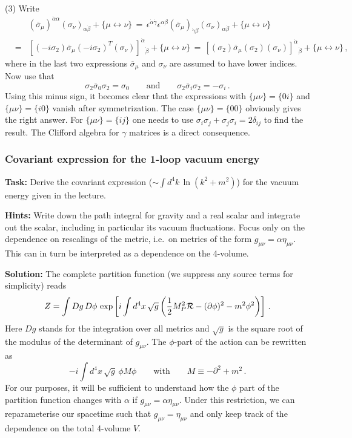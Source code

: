 \documentclass[12pt]{article}
\newcommand{\be}{\begin{equation}}
\newcommand{\ee}{\end{equation}}
\newcommand{\bea}{\begin{eqnarray}}
\newcommand{\eea}{\end{eqnarray}}
\newcommand{\ol}{\overline}
\numberwithin{equation}{section}
\begin{document}
\noindent
(3) Write
\bea
&&(\ol{\sigma}_\mu)^{\dot{\alpha}\alpha}(\sigma_\nu)_{\alpha\dot{\beta}}+\{\mu\leftrightarrow\nu\}\,=\,\epsilon^{\dot{\alpha}\dot{\gamma}}\epsilon^{\alpha\beta}
(\ol{\sigma}_\mu)_{\dot{\gamma}\beta}(\sigma_\nu)_{\alpha\dot{\beta}}+\{\mu\leftrightarrow\nu\}
\\
&=&[(-i\sigma_2)\ol{\sigma}_\mu(-i\sigma_2)^T(\sigma_\nu)]^{\dot{\alpha}}{}_{\dot{\beta}}+\{\mu\leftrightarrow\nu\}\,=\,
[(\sigma_2)\ol{\sigma}_\mu(\sigma_2)(\sigma_\nu)]^{\dot{\alpha}}{}_{\dot{\beta}}+\{\mu\leftrightarrow\nu\}\,,
\eea
where in the last two expressions $\ol{\sigma}_\mu$ and $\sigma_\nu$ are assumed to have lower indices. Now use that
\be
\sigma_2\ol{\sigma}_0\sigma_2=\sigma_0\qquad \mbox{and}\qquad
\sigma_2\ol{\sigma}_i\sigma_2=-\sigma_i\,.
\ee
Using this minus sign, it becomes clear that the expressions with $\{\mu\nu\}=\{0i\}$ and $\{\mu\nu\}=\{i0\}$ vanish after symmetrization. The case $\{\mu\nu\}=\{00\}$ obviously gives the right answer. For  $\{\mu\nu\}=\{ij\}$ one needs to use $\sigma_i\sigma_j+\sigma_j\sigma_i=2\delta_{ij}$ to find the result. The Clifford algebra for $\gamma$ matrices is a direct consequence. 






\subsubsection{Covariant expression for the 1-loop vacuum energy}

{\bf Task:} Derive the covariant expression ($\sim \int d^4k\,\ln(k^2+m^2)$) for the vacuum energy given in the lecture.

\noindent
{\bf Hints:} Write down the path integral for gravity and a real scalar and integrate out the scalar, including in particular its vacuum fluctuations. Focus only on the dependence on rescalings of the metric, i.e.~on metrics of the form $g_{\mu\nu}=\alpha\eta_{\mu\nu}$. This can in turn be interpreted as a dependence on the 4-volume.

\noindent
{\bf Solution:} The complete partition function (we suppress any source terms for simplicity) reads
\be
Z=\int Dg\,D\phi\,\exp\left[i\int d^4x\,\sqrt{g}\left(\frac{1}{2}M_P^2{\cal R}- (\partial\phi)^2-m^2\phi^2\right)\right]\,.
\ee
Here $Dg$ stands for the integration over all metrics and $\sqrt{g}$ is the square root of the modulus of the determinant of $g_{\mu\nu}$. The $\phi$-part of the action can be rewritten as 
\be
-i\int d^4x\,\sqrt{g}\,\phi M \phi\qquad\mbox{with}\qquad M\equiv -\partial^2+m^2\,.
\ee
For our purposes, it will be sufficient to understand how the $\phi$ part of the partition function changes with $\alpha$ if $g_{\mu\nu}=\alpha\eta_{\mu\nu}$. Under this restriction, we can reparameterise our spacetime such that $g_{\mu\nu}= \eta_{\mu\nu}$ and only keep track of the dependence on the total 4-volume $V$. 
\end{document}

